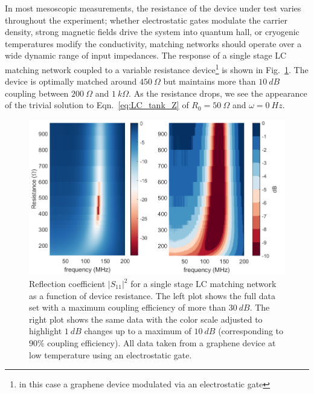 In most mesoscopic measurements, the resistance of the device under test varies throughout the experiment; whether electrostatic gates modulate the carrier density, strong magnetic fields drive the system into quantum hall, or cryogenic temperatures modify the conductivity, matching networks should operate over a wide dynamic range of input impedances. The response of a single stage LC matching network coupled to a variable resistance device\footnote{in this case a graphene device modulated via an electrostatic gate} is shown in Fig.~\ref{fig:S11vsR}. The device is optimally matched around $450~\Omega$ but maintains more than $10~dB$ coupling between $200~\Omega$ and $1~k\Omega$. As the resistance drops, we see the appearance of the trivial solution to Eqn.~\ref{eq:LC_tank_Z} of $R_0=50~\Omega$ and $\omega=0~Hz$. 
\begin{figure}
\centering
\includegraphics[width=120mm]{figures/Johnson_noise_thermometry/S11vsR.png}
\caption{Reflection coefficient $|S_{11}|^2$ for a single stage LC matching network as a function of device resistance. The left plot shows the full data set with a maximum coupling efficiency of more than $30~dB$. The right plot shows the same data with the color scale adjusted to highlight $1~dB$ changes up to a maximum of $10~dB$ (corresponding to $90\%$ coupling efficiency). All data taken from a graphene device at low temperature using an electrostatic gate.}
\label{fig:S11vsR}
\end{figure}

